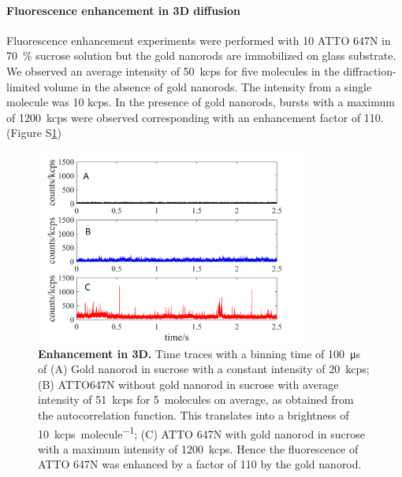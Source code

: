 \paragraph*{Fluorescence enhancement in 3D diffusion}
Fluorescence enhancement experiments were performed with \SI{10}{\nM} ATTO 647N in \SI{70}{\percent} sucrose solution but the gold nanorods are immobilized on glass substrate.
We observed an average intensity of \SI{50}{kcps} for five molecules in the diffraction-limited volume in the absence of gold nanorods.
The intensity from a single molecule was 10 kcps.
In the presence of gold nanorods, bursts with a maximum of \SI{1200}{kcps} were observed corresponding with an enhancement factor of 110. (Figure S\ref{SIfig:3D-enhc})

\begin{figure}[ht]
  \centering
  \includegraphics[width=0.8\textwidth]{3D_enhc}
  \makeatletter
  \renewcommand{\fnum@figure}{\figurename~S\thefigure}
  \makeatother{}
  \caption{\textbf{Enhancement in 3D.} Time traces with a binning time of \SI{100}{\us} of (A) Gold nanorod in sucrose with a constant intensity of \SI{20}{kcps}; (B) ATTO647N without gold nanorod in sucrose with average intensity of \SI{51}{kcps} for \SI{5}{ molecules} on average, as obtained from the autocorrelation function.
  This translates into a brightness of \SI{10}{ kcps\per molecule}; (C) ATTO 647N with gold nanorod in sucrose with a maximum intensity of \SI{1200}{ kcps}.
  Hence the fluorescence of ATTO 647N was enhanced by a factor of 110 by the gold nanorod.}
  \label{SIfig:3D-enhc}
\end{figure}


